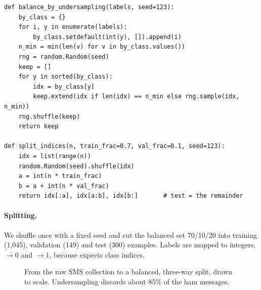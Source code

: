 \begin{lstlisting}[caption={Undersampling to balance classes, then a seeded three-way split (from \ident{llmsys/finetune.py}).},label={lst:classify:balance}]
def balance_by_undersampling(labels, seed=123):
    by_class = {}
    for i, y in enumerate(labels):
        by_class.setdefault(int(y), []).append(i)
    n_min = min(len(v) for v in by_class.values())
    rng = random.Random(seed)
    keep = []
    for y in sorted(by_class):
        idx = by_class[y]
        keep.extend(idx if len(idx) == n_min else rng.sample(idx, n_min))
    rng.shuffle(keep)
    return keep

def split_indices(n, train_frac=0.7, val_frac=0.1, seed=123):
    idx = list(range(n))
    random.Random(seed).shuffle(idx)
    a = int(n * train_frac)
    b = a + int(n * val_frac)
    return idx[:a], idx[a:b], idx[b:]       # test = the remainder
\end{lstlisting}

\paragraph{Splitting.} We shuffle once with a fixed seed and cut the balanced set
70/10/20 into training (1{,}045), validation (149) and test (300) examples. Labels are
mapped to integers, $\to 0$ and $\to 1$, because
 expects class indices.

\begin{figure}[ht]
\centering
{}
\caption{From the raw SMS collection to a balanced, three-way split, drawn to scale.
Undersampling discards about 85\% of the ham messages.}
\label{fig:classify:split}
\end{figure}

